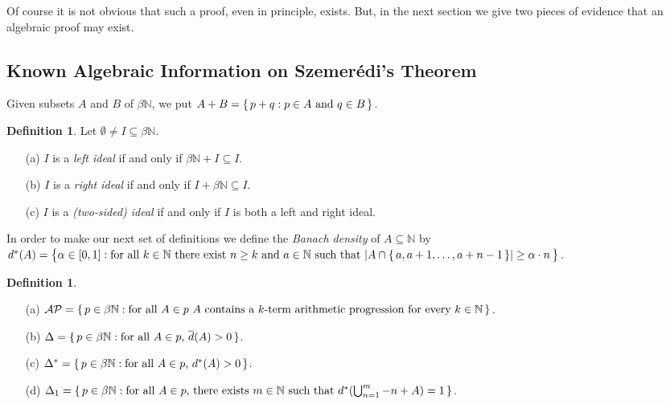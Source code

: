 \documentclass[12pt]{article}
\theoremstyle{plain}
\theoremstyle{definition}
\newtheorem{defn}[thm]{Definition}
\newcommand{\bbN}{\mathbb{N}}
\begin{document}
Of course it is not obvious that such a proof, even in principle,
exists.
But, in the next section we give two pieces of evidence that an
algebraic proof may exist. 

\subsection{Known Algebraic Information on  Szemer\'{e}di's Theorem}
Given subsets $A$ and $B$ of $\beta\bbN$, we put $A+B = \{\, p + q : p
\in A \hbox{ and } q \in B \,\}$.
  \begin{defn}
    Let $\emptyset \ne I \subseteq \beta\bbN$.
      \begin{itemize}
        \item[(a)] $I$ is a \textsl{left ideal} if and only if
          $\beta\bbN + I \subseteq I$.
        \item[(b)] $I$ is a \textsl{right ideal} if and only if
          $I+\beta\bbN \subseteq I$.
        \item[(c)] $I$ is a \textsl{(two-sided) ideal} if and only if
          $I$ is both a left and right ideal.
      \end{itemize}
  \end{defn}
In order to make our next set of definitions we define the
\textsl{Banach density} of $A \subseteq \bbN$ by $d^*(A) = \bigl\{
\alpha \in [0,1] : \hbox{for all $k \in \bbN$}\hbox{ there exist $n
  \ge k$ and $a \in \bbN$}\hbox{ such that $|A \cap \{\,a, a+1,
  \ldots, a+n-1\,\}| \ge \alpha \cdot n$} \,\bigr\}$.

  \begin{defn}
    \begin{itemize}
      \item[(a)] $\mathcal{AP} = \{\, p \in \beta\bbN : \hbox{for all
          $A \in p$ $A$ contains a $k$-term arithmetic progression
          for every $k \in \bbN$} \,\}$.
      \item[(b)] $\Delta = \{\, p \in \beta\bbN : \hbox{for all $A \in
          p$, $\overline{d}(A) > 0$} \,\}$.
      \item[(c)] $\Delta^* = \{\, p \in \beta\bbN : \hbox{for all $A
          \in p$, $d^*(A) > 0$} \,\}$.
      \item[(d)] $\Delta_1 = \{\, p \in \beta\bbN : \hbox{for all $A
            \in p$, there exists $m \in \bbN$ such that
            $d^*(\bigcup_{n=1}^m -n+A) = 1$} \,\}$.
    \end{itemize}
  \end{defn}
\end{document}
